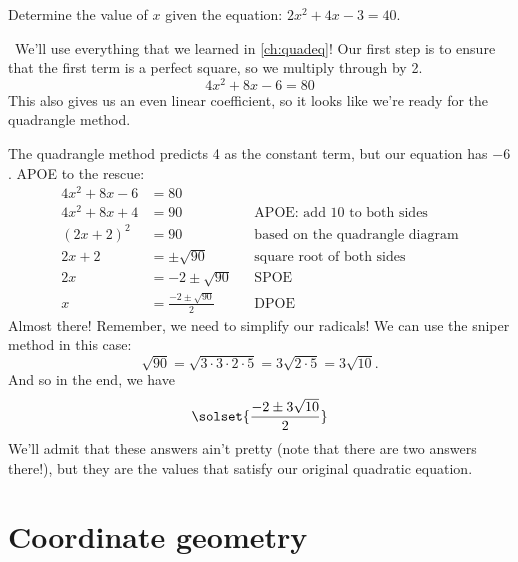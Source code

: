 \begin{boxedex}
Determine the value of $x$ given the equation: $2x^2+4x-3=40$.

\exsoln\ We'll use everything that we learned in \cref{ch:quadeq}! Our first step is to ensure that the first term is a perfect square, so we multiply through by 2.
\[4x^2 + 8x - 6 = 80\]
This also gives us an even linear coefficient, so it looks like we're ready for the quadrangle method.
\begin{center}
\end{center}
The quadrangle method predicts 4 as the constant term, but our equation has $-6$. APOE to the rescue:
\begin{align*}
4x^2 + 8x - 6 &= 80
\\
4x^2 + 8x + 4 &= 90
&&\text{APOE: add 10 to both sides}
\\
(2x+2)^2 &= 90
&&\text{based on the quadrangle diagram}
\\
2x+2 &= \pm\sqrt{90}
&&\text{square root of both sides}
\\
2x &= -2 \pm\sqrt{90}
&&\text{SPOE}
\\[1ex]
x &= \frac{-2 \pm\sqrt{90}}{2}
&&\text{DPOE}
\end{align*}
Almost there! Remember, we need to simplify our radicals! We can use the sniper method in this case:
\[\sqrt{90} = \sqrt{3\cdot3\cdot2\cdot5} = 3\sqrt{2\cdot5} = 3\sqrt{10}.\]
And so in the end, we have
\[\solset{\frac{-2 \pm 3\sqrt{10}}{2}}\]
We'll admit that these answers ain't pretty (note that there are two answers there!), but they are the values that satisfy our original quadratic equation.
\end{boxedex}

\section{Coordinate geometry}
\label{sec:coordgeometry}

